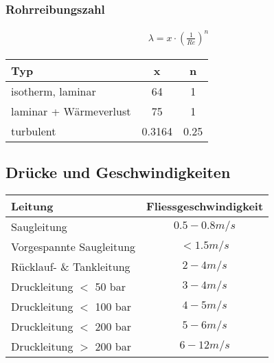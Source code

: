 \subsubsection{Rohrreibungszahl}
\begin{align*}
\lambda = x \cdot \left( \frac{1}{Re} \right)^n
\end{align*}

\begin{tabular}{lcc}
Typ & x & n \\
\hline 
isotherm, laminar & 64 & 1 \\
laminar + Wärmeverlust & 75 & 1 \\
turbulent & 0.3164 & 0.25
\end{tabular}



\subsection{Drücke und Geschwindigkeiten}

\begin{tabular}{l|c}
    Leitung & Fliessgeschwindigkeit \\
    \hline
    Saugleitung & $0.5 - 0.8 m/s$ \\
    Vorgespannte Saugleitung & $< 1.5 m/s$ \\
    Rücklauf- \& Tankleitung & $2 - 4 m/s$ \\
    Druckleitung $<$ 50 bar & $3 - 4 m/s$ \\
    Druckleitung $<$ 100 bar & $4 - 5 m/s$ \\
    Druckleitung $<$ 200 bar & $5 - 6 m/s$ \\
    Druckleitung $>$ 200 bar & $6 - 12 m/s$
\end{tabular}
